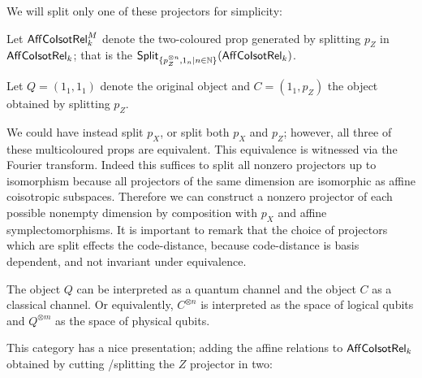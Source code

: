 We will split only one of these projectors for simplicity:
\begin{definition}
Let $\mathsf{Aff}{\sf Co}{\sf Isot}\mathsf{Rel}_k^M$ denote the two-coloured prop generated by splitting $p_Z$ in $\mathsf{Aff}{\sf Co}{\sf Isot}\mathsf{Rel}_k$; that is the ${\sf Split}_{\{p_Z^{\otimes n}, 1_n | n \in \mathbb{N} \}}(\mathsf{Aff}{\sf Co}{\sf Isot}\mathsf{Rel}_k)$.


Let $Q=(1_1,1_1)$ denote the original object and $C=(1_1,p_Z)$ the object obtained by splitting $p_Z$.
\end{definition}
We could have instead split $p_X$, or split both $p_X$ and $p_Z$; however, all three of these multicoloured props are equivalent.  This equivalence is witnessed via the Fourier transform. Indeed this suffices to split all nonzero projectors up to isomorphism because all projectors of the same dimension are isomorphic as affine coisotropic subspaces.  Therefore we can construct a nonzero projector of each possible nonempty dimension by composition with $p_X$ and affine symplectomorphisms.  
It is important to remark that the choice of projectors which are split effects the code-distance, because code-distance is basis dependent, and not invariant under equivalence.
\begin{remark}
The object $Q$ can be interpreted as a quantum channel and the object $C$ as a classical channel. Or equivalently, $C^{\otimes n}$ is interpreted as the space of logical qubits and  $Q^{\otimes m}$  as the space of physical qubits.
\end{remark}
This category has a nice presentation;  adding the affine relations to  $\mathsf{Aff}{\sf Co}{\sf Isot}\mathsf{Rel}_k$ obtained by cutting /splitting the $Z$ projector in two:
